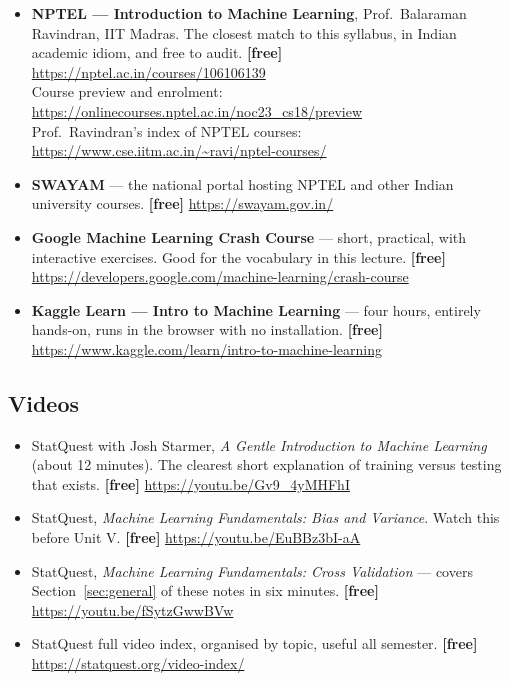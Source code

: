 \documentclass[11pt]{article}
\begin{document}
\begin{itemize}[leftmargin=*]
  \item \textbf{NPTEL --- Introduction to Machine Learning}, Prof.\ Balaraman
    Ravindran, IIT Madras. The closest match to this syllabus, in Indian
    academic idiom, and free to audit. \textbf{[free]}\\
    \url{https://nptel.ac.in/courses/106106139}\\
    Course preview and enrolment:
    \url{https://onlinecourses.nptel.ac.in/noc23_cs18/preview}\\
    Prof.\ Ravindran's index of NPTEL courses:
    \url{https://www.cse.iitm.ac.in/~ravi/nptel-courses/}
  \item \textbf{SWAYAM} --- the national portal hosting NPTEL and other Indian
    university courses. \textbf{[free]} \url{https://swayam.gov.in/}
  \item \textbf{Google Machine Learning Crash Course} --- short, practical, with
    interactive exercises. Good for the vocabulary in this lecture.
    \textbf{[free]}
    \url{https://developers.google.com/machine-learning/crash-course}
  \item \textbf{Kaggle Learn --- Intro to Machine Learning} --- four hours,
    entirely hands-on, runs in the browser with no installation.
    \textbf{[free]} \url{https://www.kaggle.com/learn/intro-to-machine-learning}
\end{itemize}

\subsection*{Videos}

\begin{itemize}[leftmargin=*]
  \item StatQuest with Josh Starmer, \emph{A Gentle Introduction to Machine
    Learning} (about 12 minutes). The clearest short explanation of training
    versus testing that exists. \textbf{[free]} \url{https://youtu.be/Gv9_4yMHFhI}
  \item StatQuest, \emph{Machine Learning Fundamentals: Bias and Variance}.
    Watch this before Unit V. \textbf{[free]} \url{https://youtu.be/EuBBz3bI-aA}
  \item StatQuest, \emph{Machine Learning Fundamentals: Cross Validation} ---
    covers Section~\ref{sec:general} of these notes in six minutes.
    \textbf{[free]} \url{https://youtu.be/fSytzGwwBVw}
  \item StatQuest full video index, organised by topic, useful all semester.
    \textbf{[free]} \url{https://statquest.org/video-index/}
\end{itemize}
\end{document}
